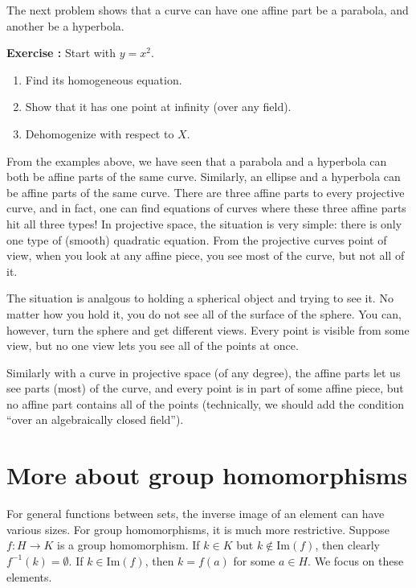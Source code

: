 \documentclass[12pt]{amsart}
\renewcommand{\Im}{\mathrm{Im}} %
\newcounter{probs}
\newenvironment{prob}{%
  \refstepcounter{probs}
  \par\medskip\noindent\textbf{Exercise \theprobs:} }{\par\medskip}
\theoremstyle{plain}
\theoremstyle{definition}
\theoremstyle{remark}
\begin{document}
The next problem shows that a curve can have one affine part be a
parabola, and another be a hyperbola.
\begin{prob}
  Start with $y=x^2$.
  \begin{enumerate}
  \item Find its homogeneous equation.
  \item Show that it has one point at infinity (over any field).
  \item Dehomogenize with respect to $X$.
  \end{enumerate}
\end{prob}

From the examples above, we have seen that a parabola and a hyperbola
can both be affine parts of the same curve.  Similarly, an ellipse and
a hyperbola can be affine parts of the same curve.  There are three
affine parts to every projective curve, and in fact, one can find
equations of curves where these three affine parts hit all three
types!  In projective space, the situation is very simple: there is
only one type of (smooth) quadratic equation.  From the projective
curves point of view, when you look at any affine piece, you see most
of the curve, but not all of it.

The situation is analgous to holding a spherical object and trying to
see it.  No matter how you hold it, you do not see all of the surface
of the sphere.  You can, however, turn the sphere and get different
views.  Every point is visible from some view, but no one view lets
you see all of the points at once.

Similarly with a curve in projective space (of any degree), the affine
parts let us see parts (most) of the curve, and every point is in part
of some affine piece, but no affine part contains all of the points
(technically, we should add the condition ``over an algebraically
closed field'').

\section{More about group homomorphisms}
\label{coset-home}

For general functions between sets, the inverse image of an element
can have various sizes.  For group homomorphisms, it is much more
restrictive.  Suppose $f:H\to K$ is a group homomorphism.  If $k\in K$
but $k\not\in\Im(f)$, then clearly $f^{-1}(k)=\emptyset$.  If $k\in
\Im(f)$, then $k=f(a)$ for some $a\in H$.  We focus on these elements.
\end{document}
